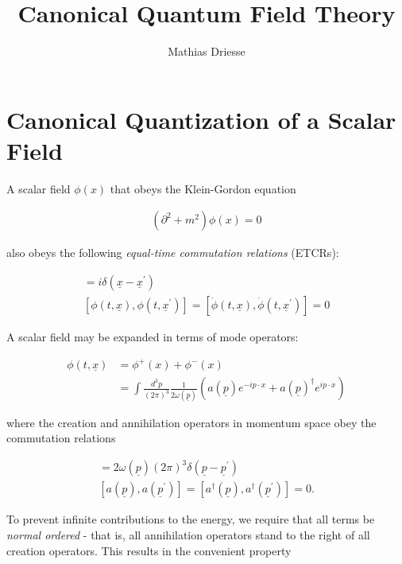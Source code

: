 \documentclass{article}
\title{Canonical Quantum Field Theory}
\author{Mathias Driesse}
\begin{document}
\maketitle

\section{Canonical Quantization of a Scalar Field}

A scalar field $\phi(x)$ that obeys the Klein-Gordon equation

\begin{align}
    (\partial^2 + m^2)\phi(x) = 0
\end{align}

also obeys the following \textit{equal-time commutation relations} (ETCRs):

\begin{gather}
    [\phi(t, \underline{x}), \dot{\phi}(t, \underline{x}^\prime)] = i\delta(\underline{x} - \underline{x}^\prime) \\
    [\phi(t, \underline{x}), \phi(t, \underline{x}^\prime)] = [\dot{\phi}(t, \underline{x}), \dot{\phi}(t, \underline{x}^\prime)] = 0
\end{gather}

A scalar field may be expanded in terms of mode operators:

\begin{align}
    \phi(t, \underline{x}) &= \phi^+(x) + \phi^-(x) \\
    &= \int \frac{d^3 p}{(2 \pi)^3} \frac{1}{2 \omega(\underline{p})}\left(a(\underline{p}) e^{-i p \cdot x}+a(\underline{p})^{\dagger} e^{i p \cdot x}\right)
\end{align}

where the creation and annihilation operators in momentum space obey the commutation relations

\begin{align}
    [a (\underline{p}), a^\dagger(\underline{p}^\prime)] = 2\omega(\underline{p}) (2\pi)^3 \delta(\underline{p}-\underline{p}^\prime) \\
    [a (\underline{p}), a(\underline{p}^\prime)] = [a^\dagger(\underline{p}), a^\dagger(\underline{p}^\prime)] = 0.
\end{align}

To prevent infinite contributions to the energy, we require that all terms be \textit{normal ordered} - that is, all annihilation operators stand to the right of all creation operators. This results in the convenient property
\end{document}
